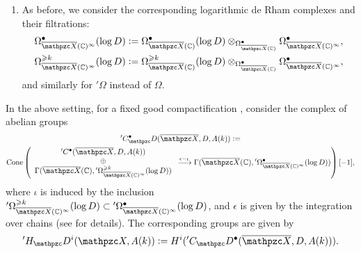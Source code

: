 \begin{enumerate}
\item As before, we consider the corresponding logarithmic de Rham complexes and
  their filtrations:
  \begin{align*}
    \Omega^\bullet_{\overline{\mathcal{X}} (\CC)^\infty} (\log D) & \dfn
                                                                    \Omega_{\overline{\mathcal{X}} (\CC)}^\bullet (\log D)
                                                                    \otimes_{\Omega_{\overline{\mathcal{X}} (\CC)}^\bullet}
                                                                    \Omega_{\overline{\mathcal{X}} (\CC)^\infty}^\bullet, \\
    \Omega_{\overline{\mathcal{X}} (\CC)^\infty}^{\geqslant k} (\log D) & \dfn
                                                                          \Omega_{\overline{\mathcal{X}} (\CC)}^{\geqslant k} (\log D)
                                                                          \otimes_{\Omega_{\overline{\mathcal{X}} (\CC)}^\bullet}
                                                                          \Omega_{\overline{\mathcal{X}} (\CC)^\infty}^\bullet,
  \end{align*}
  and similarly for ${}' \Omega$ instead of $\Omega$.
\end{enumerate}

\begin{definition}
  \label{dfn:deligne-homology}
  In the above setting, for a fixed good compactification
  , consider the complex of abelian groups
  \begin{multline*}
    {}' C^\bullet_\mathcal{D} (\overline{\mathcal{X}}, D, A (k)) \dfn \\
    \Cone \left(
      \begin{array}{c}
        {}' C^\bullet (\overline{\mathcal{X}}, D, A (k)) \\
        \oplus\\
        \Gamma (\overline{\mathcal{X}} (\CC), {}' \Omega_{\overline{\mathcal{X}} (\CC)^\infty}^{\geqslant k}(\log D))
      \end{array}
      \xrightarrow{\epsilon-\iota}
      \Gamma (\overline{\mathcal{X}} (\CC), {}' \Omega_{\overline{\mathcal{X}} (\CC)^\infty}^\bullet (\log D))
    \right) [-1],
  \end{multline*}
  where $\iota$ is induced by the inclusion
  ${}' \Omega_{\overline{\mathcal{X}} (\CC)^\infty}^{\geqslant k} (\log D)
  \subset {}' \Omega_{\overline{\mathcal{X}} (\CC)^\infty}^\bullet (\log D)$,
  and $\epsilon$ is given by the integration over chains (see
  \cite{Jannsen-Homology} for details). The corresponding  groups are given by
  \[ {}' H_\mathcal{D}^i (\mathcal{X}, A (k)) \dfn
    H^i ({}' C_\mathcal{D}^\bullet (\overline{\mathcal{X}}, D, A (k))). \]
\end{definition}

